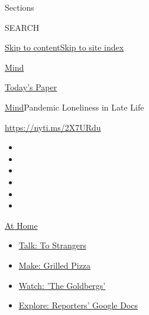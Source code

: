 Sections

SEARCH

\protect\hyperlink{site-content}{Skip to
content}\protect\hyperlink{site-index}{Skip to site index}

\href{https://www.nytimes3xbfgragh.onion/section/well/mind}{Mind}

\href{https://myaccount.nytimes3xbfgragh.onion/auth/login?response_type=cookie\&client_id=vi}{}

\href{https://www.nytimes3xbfgragh.onion/section/todayspaper}{Today's
Paper}

\href{/section/well/mind}{Mind}\textbar{}Pandemic Loneliness in Late
Life

\url{https://nyti.ms/2X7URdu}

\begin{itemize}
\item
\item
\item
\item
\item
\item
\end{itemize}

\href{https://www.nytimes3xbfgragh.onion/spotlight/at-home?action=click\&pgtype=Article\&state=default\&region=TOP_BANNER\&context=at_home_menu}{At
Home}

\begin{itemize}
\tightlist
\item
  \href{https://www.nytimes3xbfgragh.onion/2020/08/03/well/family/the-benefits-of-talking-to-strangers.html?action=click\&pgtype=Article\&state=default\&region=TOP_BANNER\&context=at_home_menu}{Talk:
  To Strangers}
\item
  \href{https://www.nytimes3xbfgragh.onion/2020/08/01/at-home/coronavirus-make-pizza-on-a-grill.html?action=click\&pgtype=Article\&state=default\&region=TOP_BANNER\&context=at_home_menu}{Make:
  Grilled Pizza}
\item
  \href{https://www.nytimes3xbfgragh.onion/2020/07/31/arts/television/goldbergs-abc-stream.html?action=click\&pgtype=Article\&state=default\&region=TOP_BANNER\&context=at_home_menu}{Watch:
  'The Goldbergs'}
\item
  \href{https://www.nytimes3xbfgragh.onion/interactive/2020/at-home/even-more-reporters-editors-diaries-lists-recommendations.html?action=click\&pgtype=Article\&state=default\&region=TOP_BANNER\&context=at_home_menu}{Explore:
  Reporters' Google Docs}
\end{itemize}


